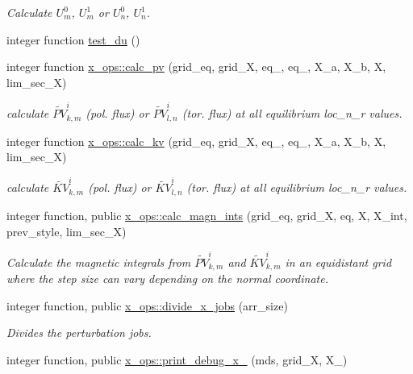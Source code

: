 \begin{DoxyCompactItemize}
\begin{DoxyCompactList}\small\item\em Calculate $U_m^0$, $U_m^1$ or $U_n^0$, $U_n^1$. \end{DoxyCompactList}\item 
integer function \hyperlink{X__ops_8f90_a60ad682c469a085ff3f744ce3191940f}{test\+\_\+du} ()
\item 
integer function \hyperlink{namespacex__ops_a51f3bf0b4c8d688ffbcc3a1adbca9762}{x\+\_\+ops\+::calc\+\_\+pv} (grid\+\_\+eq, grid\+\_\+X, eq\+\_, eq\+\_, X\+\_\+a, X\+\_\+b, X, lim\+\_\+sec\+\_\+X)
\begin{DoxyCompactList}\small\item\em calculate $\widetilde{PV}_{k,m}^i$ (pol. flux) or $\widetilde{PV}_{l,n}^i$ (tor. flux) at all equilibrium {\ttfamily loc\+\_\+n\+\_\+r} values. \end{DoxyCompactList}\item 
integer function \hyperlink{namespacex__ops_a045e8903230dfa0fb8b89b458d0c8ee2}{x\+\_\+ops\+::calc\+\_\+kv} (grid\+\_\+eq, grid\+\_\+X, eq\+\_, eq\+\_, X\+\_\+a, X\+\_\+b, X, lim\+\_\+sec\+\_\+X)
\begin{DoxyCompactList}\small\item\em calculate $\widetilde{KV}_{k,m}^i$ (pol. flux) or $\widetilde{KV}_{l,n}^i$ (tor. flux) at all equilibrium {\ttfamily loc\+\_\+n\+\_\+r} values. \end{DoxyCompactList}\item 
integer function, public \hyperlink{namespacex__ops_a6df79622d1b95d54ab3e542751a5881d}{x\+\_\+ops\+::calc\+\_\+magn\+\_\+ints} (grid\+\_\+eq, grid\+\_\+X, eq, X, X\+\_\+int, prev\+\_\+style, lim\+\_\+sec\+\_\+X)
\begin{DoxyCompactList}\small\item\em Calculate the magnetic integrals from $\widetilde{PV}_{k,m}^i$ and $\widetilde{KV}_{k,m}^i$ in an equidistant grid where the step size can vary depending on the normal coordinate. \end{DoxyCompactList}\item 
integer function, public \hyperlink{namespacex__ops_a677c88d85fe1bfbf3579a2421ce16f2f}{x\+\_\+ops\+::divide\+\_\+x\+\_\+jobs} (arr\+\_\+size)
\begin{DoxyCompactList}\small\item\em Divides the perturbation jobs. \end{DoxyCompactList}\item 
integer function, public \hyperlink{namespacex__ops_a8bdd87db80570a01cf35ca50184ae879}{x\+\_\+ops\+::print\+\_\+debug\+\_\+x\+\_} (mds, grid\+\_\+X, X\+\_)

\end{DoxyCompactItemize}
